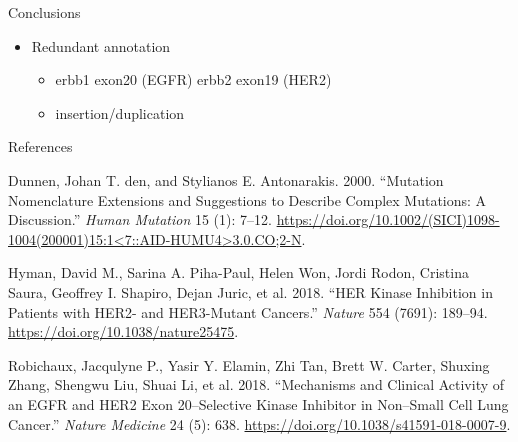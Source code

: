 \documentclass[
  ignorenonframetext,
]{beamer}
\providecommand{\tightlist}{%
  \setlength{\itemsep}{0pt}\setlength{\parskip}{0pt}}
\begin{document}
\begin{frame}{Conclusions}
\protect\hypertarget{conclusions}{}

\begin{itemize}
\tightlist
\item
  Redundant annotation

  \begin{itemize}
  \tightlist
  \item
    erbb1 exon20 (EGFR) erbb2 exon19 (HER2)
  \item
    insertion/duplication
  \end{itemize}
\end{itemize}

\end{frame}

\begin{frame}{References}
\protect\hypertarget{references}{}

\hypertarget{refs}{}
\leavevmode\hypertarget{ref-dunnen_2000_mutation_hummutat}{}%
Dunnen, Johan T. den, and Stylianos E. Antonarakis. 2000. ``Mutation
Nomenclature Extensions and Suggestions to Describe Complex Mutations: A
Discussion.'' \emph{Human Mutation} 15 (1): 7--12.
\href{https://doi.org/10.1002/(SICI)1098-1004(200001)15:1\%3C7::AID-HUMU4\%3E3.0.CO;2-N}{https://doi.org/10.1002/(SICI)1098-1004(200001)15:1\textless{}7::AID-HUMU4\textgreater{}3.0.CO;2-N}.

\leavevmode\hypertarget{ref-hyman_2018_her_nature}{}%
Hyman, David M., Sarina A. Piha-Paul, Helen Won, Jordi Rodon, Cristina
Saura, Geoffrey I. Shapiro, Dejan Juric, et al. 2018. ``HER Kinase
Inhibition in Patients with HER2- and HER3-Mutant Cancers.''
\emph{Nature} 554 (7691): 189--94.
\url{https://doi.org/10.1038/nature25475}.

\leavevmode\hypertarget{ref-robichaux_2018_mechanisms_natmed}{}%
Robichaux, Jacqulyne P., Yasir Y. Elamin, Zhi Tan, Brett W. Carter,
Shuxing Zhang, Shengwu Liu, Shuai Li, et al. 2018. ``Mechanisms and
Clinical Activity of an EGFR and HER2 Exon 20--Selective Kinase
Inhibitor in Non--Small Cell Lung Cancer.'' \emph{Nature Medicine} 24
(5): 638. \url{https://doi.org/10.1038/s41591-018-0007-9}.

\end{frame}
\end{document}
